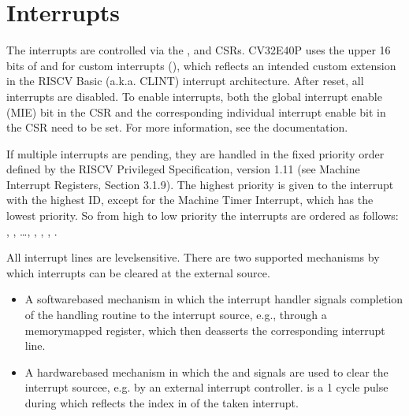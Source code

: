 \documentclass[letterpaper,10pt,english]{sphinxmanual}
\begin{document}
\section{Interrupts}
\label{\detokenize{exceptions_interrupts:interrupts}}
\sphinxAtStartPar
The  interrupts are controlled via the ,  and  CSRs. CV32E40P uses the upper 16 bits of  and  for custom interrupts (),
which reflects an intended custom extension in the RISC\sphinxhyphen{}V Basic (a.k.a. CLINT) interrupt architecture.
After reset, all interrupts are disabled.
To enable interrupts, both the global interrupt enable (MIE) bit in the  CSR and the corresponding individual interrupt enable bit in the  CSR need to be set.
For more information, see the {\hyperref[\detokenize{control_status_registers:cs-registers}]{}} documentation.

\sphinxAtStartPar
If multiple interrupts are pending, they are handled in the fixed priority order defined by the RISC\sphinxhyphen{}V Privileged Specification, version 1.11 (see Machine Interrupt Registers, Section 3.1.9).
The highest priority is given to the interrupt with the highest ID, except for the Machine Timer Interrupt, which has the lowest priority. So from high to low priority the interrupts are
ordered as follows: , , …, , , , .

\sphinxAtStartPar
All interrupt lines are level\sphinxhyphen{}sensitive. There are two supported mechanisms by which interrupts can be cleared at the external source.
\begin{itemize}
\item {} 
\sphinxAtStartPar
A software\sphinxhyphen{}based mechanism in which the interrupt handler signals completion of the handling routine to the interrupt source, e.g., through a memory\sphinxhyphen{}mapped register, which then deasserts the corresponding interrupt line.

\item {} 
\sphinxAtStartPar
A hardware\sphinxhyphen{}based mechanism in which the  and  signals are used to clear the interrupt sourcee, e.g. by an external interrupt controller.  is a 1  cycle pulse during which  reflects the index in  of the taken interrupt.

\end{itemize}
\end{document}

